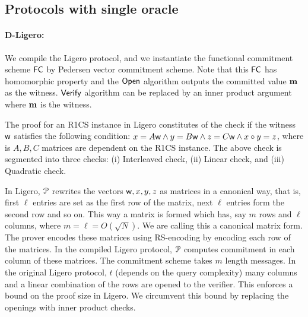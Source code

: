\subsection{Protocols with single oracle}
\paragraph*{D-Ligero:}
We compile the Ligero protocol, and we instantiate the functional commitment scheme $\mathsf{FC}$ by Pedersen vector commitment scheme. Note that this $\mathsf{FC}$ has homomorphic property and the $\mathsf{Open}$ algorithm outputs the committed value ${\bf m}$ as the witness. $\mathsf{Verify}$ algorithm can be replaced by an inner product argument where ${\bf m}$ is the witness.

The proof for an R1CS instance in Ligero constitutes of the check if the witness $\mathsf{w}$ satisfies the following condition: $x = A \mathsf{w} \land y = B \mathsf{w} \land z = C \mathsf{w} \land x \circ y = z$, where is $A, B, C$ matrices are dependent on the R1CS instance. The above check is segmented into three checks: (i) Interleaved check, (ii) Linear check, and (iii) Quadratic check. 

In Ligero, $\mathcal{P}$ rewrites the vectors $\mathsf{w}, x, y, z$ as matrices in a canonical way, that is, first $\ell$ entries are set as the first row of the matrix, next $\ell$ entries form the second row and so on. This way a matrix is formed which has, say $m$ rows and $\ell$ columns, where $m = \ell = O(\sqrt{N})$. We are calling this a canonical matrix form. The prover encodes these matrices using RS-encoding by encoding each row of the matrices.
In the compiled Ligero protocol, $\mathcal{P}$ computes commitment in each column of these matrices. The commitment scheme takes $m$ length messages. In the original Ligero protocol, $t$ (depends on the query complexity) many columns and a linear combination of the rows are opened to the verifier. This enforces a bound on the proof size in Ligero. We circumvent this bound by replacing the openings with inner product checks. 

